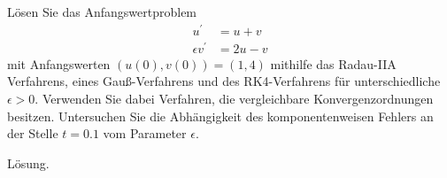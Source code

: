 \begin{exercise}
Lösen Sie das Anfangswertproblem
\begin{align*}
  u^{\prime} &= u + v \\
  \epsilon v^{\prime} &= 2u -v
\end{align*}
mit Anfangswerten $(u(0),v(0)) = (1,4)$ mithilfe das Radau-IIA Verfahrens, eines
Gauß-Verfahrens und des RK4-Verfahrens für unterschiedliche $\epsilon > 0$.
Verwenden Sie dabei Verfahren, die vergleichbare Konvergenzordnungen besitzen.
Untersuchen Sie die Abhängigkeit des komponentenweisen Fehlers an der Stelle
$t = 0.1$ vom Parameter $\epsilon$.
\end{exercise}
\begin{solution}
Lösung.
\end{solution}
